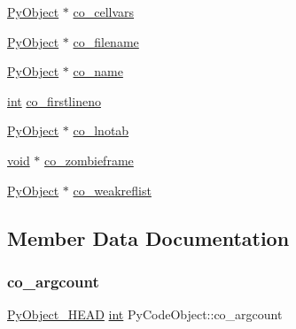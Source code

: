 \begin{DoxyCompactItemize}
\item 
\mbox{\hyperlink{_python27_2object_8h_aadc84ac7aed2cfa6f20c25f62bf3dac7}{Py\+Object}} $\ast$ \mbox{\hyperlink{struct_py_code_object_ab08cf541a92d6fc56af2cc1419816e23}{co\+\_\+cellvars}}
\item 
\mbox{\hyperlink{_python27_2object_8h_aadc84ac7aed2cfa6f20c25f62bf3dac7}{Py\+Object}} $\ast$ \mbox{\hyperlink{struct_py_code_object_a15d8ea3dbc511eccdafc0cc0743632aa}{co\+\_\+filename}}
\item 
\mbox{\hyperlink{_python27_2object_8h_aadc84ac7aed2cfa6f20c25f62bf3dac7}{Py\+Object}} $\ast$ \mbox{\hyperlink{struct_py_code_object_a10bd7a8a3f23047cdb6eb10e032176bf}{co\+\_\+name}}
\item 
\mbox{\hyperlink{warnings_8h_a74f207b5aa4ba51c3a2ad59b219a423b}{int}} \mbox{\hyperlink{struct_py_code_object_a068116d5abe3d1803aec12f31a638234}{co\+\_\+firstlineno}}
\item 
\mbox{\hyperlink{_python27_2object_8h_aadc84ac7aed2cfa6f20c25f62bf3dac7}{Py\+Object}} $\ast$ \mbox{\hyperlink{struct_py_code_object_ac99c01e278a9cabed14aac6713f18bf6}{co\+\_\+lnotab}}
\item 
\mbox{\hyperlink{_s_d_l__opengles2__gl2ext_8h_ae5d8fa23ad07c48bb609509eae494c95}{void}} $\ast$ \mbox{\hyperlink{struct_py_code_object_ac08ff386d0019fdf3a6b455ca1e53ff9}{co\+\_\+zombieframe}}
\item 
\mbox{\hyperlink{_python27_2object_8h_aadc84ac7aed2cfa6f20c25f62bf3dac7}{Py\+Object}} $\ast$ \mbox{\hyperlink{struct_py_code_object_a0240509a49ab73c5e157dc75c2ae88d7}{co\+\_\+weakreflist}}
\end{DoxyCompactItemize}


\subsection{Member Data Documentation}
\mbox{\label{struct_py_code_object_adc0dadab6a4224c47cfccb332b2bd0b3}} 
\subsubsection{\texorpdfstring{co\_argcount}{co\_argcount}}
{\footnotesize\ttfamily \mbox{\hyperlink{_python27_2object_8h_a0bf35c1f3ea13f925de94d8593db3b7e}{Py\+Object\+\_\+\+H\+E\+AD}} \mbox{\hyperlink{warnings_8h_a74f207b5aa4ba51c3a2ad59b219a423b}{int}} Py\+Code\+Object\+::co\+\_\+argcount}

